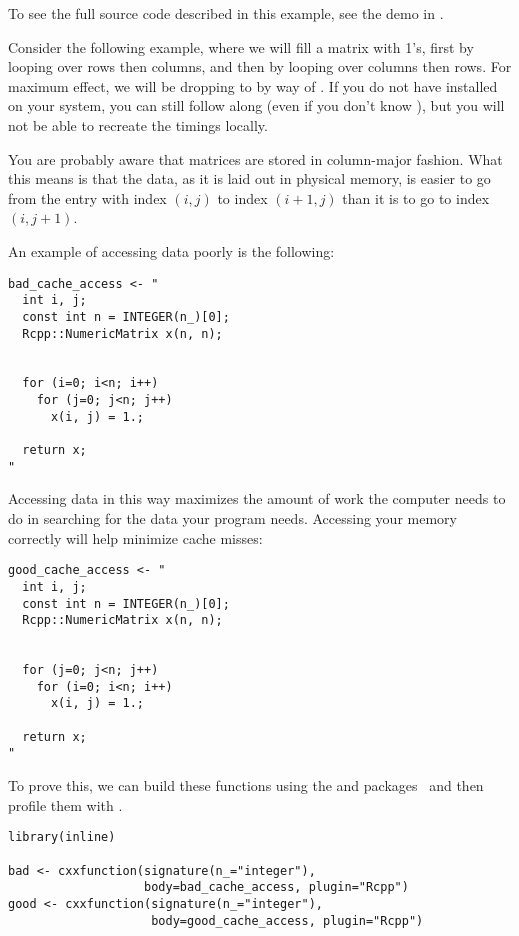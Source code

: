 To see the full source code described in this example, see the  demo in 
\thispackage.

Consider the following example, where we will fill a matrix with 1's, first by 
looping over rows then columns, and then by looping over columns then rows.  For 
maximum effect, we will be dropping to \CXX by way of .  If you do not 
have  installed on your system, you can still follow along (even if 
you don't know \CXX), but you will not be able to recreate the timings locally.

You are probably aware that \R matrices are stored in column-major fashion.  
What this means is that the data, as it is laid out in physical memory, is 
easier to go from the entry with index $(i, j)$ to index $(i+1, j)$ than 
it is to go to index $(i, j+1)$.  

An example of accessing data poorly is the following:
\begin{lstlisting}[language=rr]
bad_cache_access <- "
  int i, j;
  const int n = INTEGER(n_)[0];
  Rcpp::NumericMatrix x(n, n);
  
  
  for (i=0; i<n; i++)
    for (j=0; j<n; j++)
      x(i, j) = 1.;
  
  return x;
"
\end{lstlisting}

Accessing data in this way maximizes the 
amount of work the computer needs to do in searching for the data your program 
needs.  Accessing your memory correctly will help minimize cache misses: 

\begin{lstlisting}[language=rr]
good_cache_access <- "
  int i, j;
  const int n = INTEGER(n_)[0];
  Rcpp::NumericMatrix x(n, n);
  
  
  for (j=0; j<n; j++)
    for (i=0; i<n; i++)
      x(i, j) = 1.;
  
  return x;
"
\end{lstlisting}

To prove this, we can build these functions using the  and 
 packages~\citep{inline,rcpp} and then profile them with \thispackage.

\begin{lstlisting}[language=rr]
library(inline)

bad <- cxxfunction(signature(n_="integer"), 
                   body=bad_cache_access, plugin="Rcpp")
good <- cxxfunction(signature(n_="integer"), 
                    body=good_cache_access, plugin="Rcpp")
\end{lstlisting}

